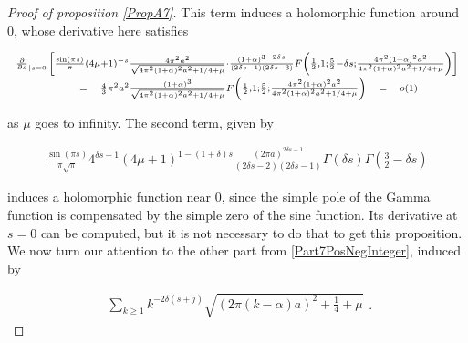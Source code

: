 \documentclass{jams-l}
\theoremstyle{definition}
\theoremstyle{remark}
\numberwithin{equation}{section}
\begin{document}
\begin{proof}[Proof of proposition \ref{PropA7}]
                    \noindent This term induces a holomorphic function around $0$, whose derivative here satisfies
                    
                    \[ \begin{array}{lllll}
                            \multicolumn{5}{l}{\scriptstyle \frac{\partial}{\partial s}_{\left \vert s = 0 \right.} \left[ \frac{\sin \left( \pi s \right)}{\pi} \left( 4 \mu + 1 \right)^{-s} \frac{4 \pi^2 a^2}{\sqrt{4 \pi^2 \left( 1 + \alpha \right)^2 a^2 + 1/4 + \mu}} \cdot \frac{\left( 1 + \alpha \right)^{3 - 2 \delta s}}{\left( 2 \delta s - 1 \right) \left( 2 \delta s - 3 \right)} F \left( \frac{1}{2}, 1; \frac{5}{2} - \delta s; \frac{4 \pi^2 \left( 1 + \alpha \right)^2 a^2}{4 \pi^2 \left( 1 + \alpha \right)^2 a^2 + 1/4 + \mu} \right) \right]} \\[0.5em]
                            
                            \qquad \qquad & \scriptstyle = & \scriptstyle \frac{4}{3} \pi^2 a^2 \frac{\left( 1 + \alpha \right)^3}{\sqrt{4 \pi^2 \left( 1 + \alpha \right)^2 a^2 + 1/4 + \mu}} F \left( \frac{1}{2}, 1; \frac{5}{2}; \frac{4 \pi^2 \left( 1 + \alpha \right)^2 a^2}{4 \pi^2 \left( 1 + \alpha \right)^2 a^2 + 1/4 + \mu} \right) & \scriptstyle = & \scriptstyle o \left( 1 \right)
                        \end{array} \]
                    
                    \noindent as $\mu$ goes to infinity. The second term, given by
                    
                    \[ \begin{array}{l}
                            \scriptstyle \frac{\sin \left( \pi s \right)}{\pi \sqrt{\pi}} 4^{\delta s - 1} \left( 4 \mu + 1 \right)^{1 - \left( 1 + \delta \right) s} \frac{\left( 2 \pi a \right)^{2 \delta s - 1}}{\left( 2 \delta s - 2 \right) \left( 2 \delta s - 1 \right)}  \Gamma \left( \delta s \right) \Gamma \left( \frac{3}{2} - \delta s \right)
                        \end{array} \]
                    
                    \noindent induces a holomorphic function near $0$, since the simple pole of the Gamma function is compensated by the simple zero of the sine function. Its derivative at $s=0$ can be computed, but it is not necessary to do that to get this proposition. We now turn our attention to the other part from \eqref{Part7PosNegInteger}, induced by
                    
                    \[ \begin{array}{c}
                            \sum\limits_{k \geqslant 1} k^{-2 \delta \left( s + j \right)} \sqrt{\left( 2 \pi \left( k - \alpha \right) a \right)^2 + \frac{1}{4} + \mu}
                        \end{array} . \]
                    

\end{proof}
\end{document}
